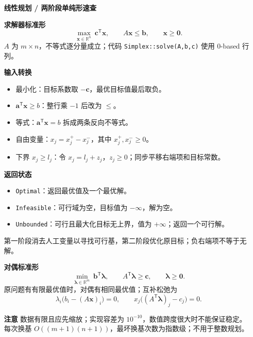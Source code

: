 \textbf{线性规划 / 两阶段单纯形速查}

\textbf{求解器标准形}
\[
\max_{\mathbf{x}\in\mathbb R^n}\ \mathbf{c}^{\mathsf T}\mathbf{x},
\qquad A\mathbf{x}\le\mathbf{b},\qquad \mathbf{x}\ge\mathbf{0}.
\]
$A$ 为 $m\times n$，不等式逐分量成立；代码 \texttt{Simplex::solve(A,b,c)} 使用 0-based 行列。

\textbf{输入转换}
\begin{itemize}
    \item 最小化：目标系数取 $-\mathbf{c}$，最优目标值最后取负。
    \item $\mathbf{a}^{\mathsf T}\mathbf{x}\ge b$：整行乘 $-1$ 后改为 $\le$。
    \item 等式：$\mathbf{a}^{\mathsf T}\mathbf{x}=b$ 拆成两条反向不等式。
    \item 自由变量：$x_j=x_j^+-x_j^-$，其中 $x_j^+,x_j^-\ge0$。
    \item 下界 $x_j\ge l_j$：令 $x_j=l_j+z_j$，$z_j\ge0$；同步平移右端项和目标常数。
\end{itemize}

\textbf{返回状态}
\begin{itemize}
    \item \texttt{Optimal}：返回最优值及一个最优解。
    \item \texttt{Infeasible}：可行域为空，目标值为 $-\infty$，解为空。
    \item \texttt{Unbounded}：可行且最大化目标无上界，值为 $+\infty$；返回一个可行解。
\end{itemize}
第一阶段消去人工变量以寻找可行基，第二阶段优化原目标；负右端项不等于无解。

\textbf{对偶标准形}
\[
\min_{\boldsymbol{\lambda}\in\mathbb R^m}\ \mathbf{b}^{\mathsf T}\boldsymbol{\lambda},
\qquad A^{\mathsf T}\boldsymbol{\lambda}\ge\mathbf{c},
\qquad \boldsymbol{\lambda}\ge\mathbf{0}.
\]
原问题有有限最优值时，对偶有相同最优值；互补松弛为
\[
\lambda_i\bigl(b_i-(A\mathbf{x})_i\bigr)=0,
\qquad x_j\bigl((A^{\mathsf T}\boldsymbol{\lambda})_j-c_j\bigr)=0.
\]

\textbf{注意}
数据有限且应先缩放；实现容差为 $10^{-10}$，数值跨度很大时不能保证稳定。
每次换基 $O((m+1)(n+1))$，最坏换基次数为指数级；不用于整数规划。
